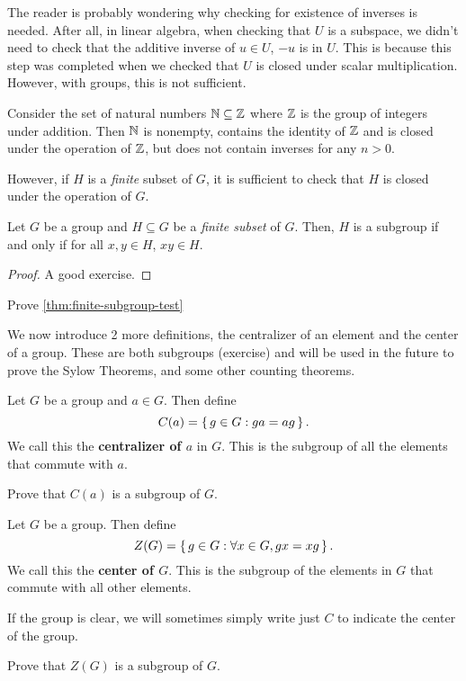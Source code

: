 \documentclass[./main.tex]{subfiles}
\begin{document}
The reader is probably wondering why checking for existence of inverses is
needed. After all, in linear algebra, when checking that $U$ is a subspace, we
didn't need to check that the additive inverse of $u \in U$, $-u$ is in $U$.
This is because this step was completed when we checked that $U$ is closed under
scalar multiplication. However, with groups, this is not sufficient.

\begin{example}
Consider the set of natural numbers $\mathbb{N} \subseteq \mathbb{Z}$ where $\mathbb{Z}$ is
the group of integers under addition. Then $\mathbb{N}$ is nonempty, contains the
identity of $\mathbb{Z}$ and is closed under the operation of $\mathbb{Z}$, but does not
contain inverses for any $n > 0$.
\end{example}

However, if $H$ is a \emph{finite} subset of $G$, it is sufficient to check that
$H$ is closed under the operation of $G$. 
\begin{theorem}
\label{thm:finite-subgroup-test}
    Let $G$ be a group and $H \subseteq G$ be a \emph{finite subset} of $G$.
    Then, $H$ is a subgroup if and only if for all $x,y \in H$, $xy \in H$.
\end{theorem}
\begin{proof}
    A good exercise.
\end{proof}
\begin{exercise}
    Prove \cref{thm:finite-subgroup-test}
\end{exercise}

We now introduce 2 more definitions, the centralizer of an element and the
center of a group. These are both subgroups (exercise) and will be used in the
future to prove the Sylow Theorems, and some other counting theorems.

\begin{definition}[Centralizer]
\label{def:centralizer-of-element}
    Let $G$ be a group and $a \in G$. Then define 
    \[
        C(a) = \set{g \in G: ga=ag}.
    \]
    We call this the \textbf{centralizer of $a$} in $G$. This is the subgroup of
    all the elements that commute with $a$. 
\end{definition}
\begin{exercise}
    Prove that $C(a)$ is a subgroup of $G$. 
\end{exercise}

\begin{definition}
\label{def:center-of-group}
    Let $G$ be a group. Then define 
    \[
        Z(G) = \set{g \in G: \forall x \in G, gx = xg}.
    \]
    We call this the \textbf{center of $G$}. This is the subgroup of the
    elements in $G$ that commute with all other elements.
\end{definition}
If the group is clear, we will sometimes simply write just $C$ to indicate the
center of the group.
\begin{exercise}
    Prove that $Z(G)$ is a subgroup of $G$.
\end{exercise}
\end{document}
